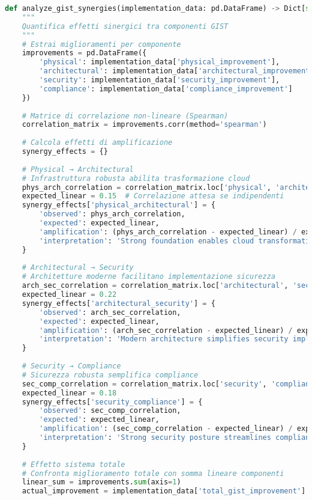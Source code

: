 \begin{lstlisting}[language=Python, caption=Analisi Sinergie Framework GIST]
def analyze_gist_synergies(implementation_data: pd.DataFrame) -> Dict[str, any]:
    """
    Quantifica effetti sinergici tra componenti GIST
    """
    # Estrai miglioramenti per componente
    improvements = pd.DataFrame({
        'physical': implementation_data['physical_improvement'],
        'architectural': implementation_data['architectural_improvement'],
        'security': implementation_data['security_improvement'],
        'compliance': implementation_data['compliance_improvement']
    })
    
    # Matrice di correlazione non-lineare (Spearman)
    correlation_matrix = improvements.corr(method='spearman')
    
    # Calcola effetti di amplificazione
    synergy_effects = {}
    
    # Physical → Architectural
    # Infrastruttura robusta abilita trasformazione cloud
    phys_arch_correlation = correlation_matrix.loc['physical', 'architectural']
    expected_linear = 0.15  # Correlazione attesa se indipendenti
    synergy_effects['physical_architectural'] = {
        'observed': phys_arch_correlation,
        'expected': expected_linear,
        'amplification': (phys_arch_correlation - expected_linear) / expected_linear,
        'interpretation': 'Strong foundation enables cloud transformation'
    }
    
    # Architectural → Security
    # Architetture moderne facilitano implementazione sicurezza
    arch_sec_correlation = correlation_matrix.loc['architectural', 'security']
    expected_linear = 0.22
    synergy_effects['architectural_security'] = {
        'observed': arch_sec_correlation,
        'expected': expected_linear,
        'amplification': (arch_sec_correlation - expected_linear) / expected_linear,
        'interpretation': 'Modern architecture simplifies security implementation'
    }
    
    # Security → Compliance
    # Sicurezza robusta semplifica compliance
    sec_comp_correlation = correlation_matrix.loc['security', 'compliance']
    expected_linear = 0.18
    synergy_effects['security_compliance'] = {
        'observed': sec_comp_correlation,
        'expected': expected_linear,
        'amplification': (sec_comp_correlation - expected_linear) / expected_linear,
        'interpretation': 'Strong security posture streamlines compliance'
    }
    
    # Effetto sistema totale
    # Confronta miglioramento totale con somma lineare componenti
    linear_sum = improvements.sum(axis=1)
    actual_improvement = implementation_data['total_gist_improvement']
    

\end{lstlisting}
